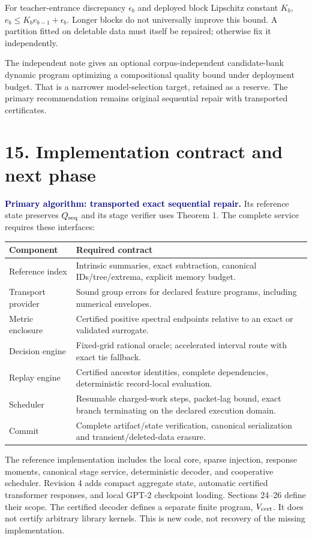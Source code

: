 \documentclass[11pt]{article}
\newcommand{\note}[1]{\textcolor{navy}{\textbf{#1}}}
\begin{document}
For teacher-entrance discrepancy $\epsilon_b$ and deployed block Lipschitz constant $K_b$, $e_b\leq K_be_{b-1}+\epsilon_b$. Longer blocks do not universally improve this bound. A partition fitted on deletable data must itself be repaired; otherwise fix it independently.

The independent note gives an optional corpus-independent candidate-bank dynamic program optimizing a compositional quality bound under deployment budget. That is a narrower model-selection target, retained as a reserve. The primary recommendation remains original sequential repair with transported certificates.

\newpage
\section*{15. Implementation contract and next phase}
\note{Primary algorithm: transported exact sequential repair.} Its reference state preserves $Q_{\rm seq}$ and its stage verifier uses Theorem 1. The complete service requires these interfaces:

\begin{tabularx}{\linewidth}{@{}p{.31\linewidth}X@{}}\toprule
Component & Required contract\\\midrule
Reference index & Intrinsic summaries, exact subtraction, canonical IDs/tree/extrema, explicit memory budget.\\
Transport provider & Sound group errors for declared feature programs, including numerical envelopes.\\
Metric enclosure & Certified positive spectral endpoints relative to an exact or validated surrogate.\\
Decision engine & Fixed-grid rational oracle; accelerated interval route with exact tie fallback.\\
Replay engine & Certified ancestor identities, complete dependencies, deterministic record-local evaluation.\\
Scheduler & Resumable charged-work steps, packet-lag bound, exact branch terminating on the declared execution domain.\\
Commit & Complete artifact/state verification, canonical serialization and transient/deleted-data erasure.\\\bottomrule
\end{tabularx}

The reference implementation includes the local core, sparse injection, response moments, canonical stage service, deterministic decoder, and cooperative scheduler. Revision 4 adds compact aggregate state, automatic certified transformer responses, and local GPT-2 checkpoint loading. Sections 24--26 define their scope. The certified decoder defines a separate finite program, $V_{\rm cert}$. It does not certify arbitrary library kernels. This is new code, not recovery of the missing implementation.
\end{document}
